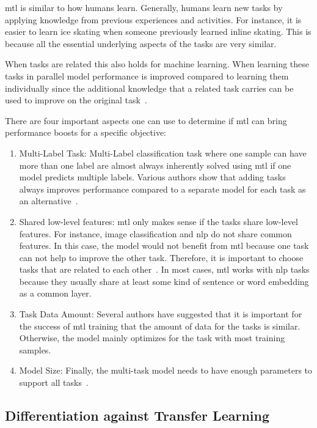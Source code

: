 \gls{mtl} is similar to how humans learn. Generally, humans learn new tasks by applying knowledge from previous experiences and activities. For instance, it is easier to learn ice skating when someone previously learned inline skating. This is because all the essential underlying aspects of the tasks are very similar.

When tasks are related this also holds for machine learning. When learning these tasks in parallel model performance is improved compared to learning them individually since the additional knowledge that a related task carries can be used to improve on the original task~\cite{Caruana1997a}. 

There are four important aspects one can use to determine if \gls{mtl} can bring performance boosts for a specific objective:
\begin{enumerate}
    \item Multi-Label Task: Multi-Label classification task where one sample can have more than one label are almost always inherently solved using \gls{mtl} if one model predicts multiple labels. Various authors show that adding tasks always improves performance compared to a separate model for each task as an alternative~\cite{Ramsundar2015}.
    \item Shared low-level features: \gls{mtl} only makes sense if the tasks share low-level features. For instance, image classification and \gls{nlp} do not share common features. In this case, the model would not benefit from \gls{mtl} because one task can not help to improve the other task. Therefore, it is important to choose tasks that are related to each other~\cite{Zhang2017a}. In most cases, \gls{mtl} works with \gls{nlp} tasks because they usually share at least some kind of sentence or word embedding as a common layer.
    \item Task Data Amount: Several authors have suggested that it is important for the success of \gls{mtl} training that the amount of data for the tasks is similar. Otherwise, the model mainly optimizes for the task with most training samples.
    \item Model Size: Finally, the multi-task model needs to have enough parameters to support all tasks~\cite{Caruana1997a}. 
    \end{enumerate}


\subsection{Differentiation against Transfer Learning}

